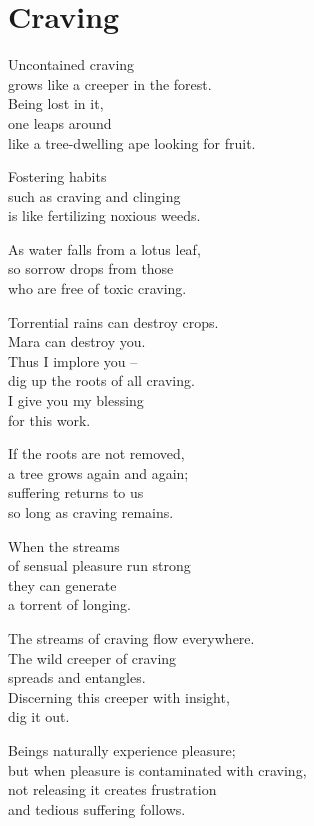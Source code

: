 
\chapter{Craving}


Uncontained craving\\
grows like a creeper in the forest.\\
Being lost in it,\\
one leaps around\\
like a tree-dwelling ape looking for fruit.


Fostering habits\\
such as craving and clinging\\
is like fertilizing noxious weeds.


As water falls from a lotus leaf,\\
so sorrow drops from those\\
who are free of toxic craving.


Torrential rains can destroy crops.\\
Mara can destroy you.\\
Thus I implore you --\\
dig up the roots of all craving.\\
I give you my blessing\\
for this work.


If the roots are not removed,\\
a tree grows again and again;\\
suffering returns to us\\
so long as craving remains.


When the streams\\
of sensual pleasure run strong\\
they can generate\\
a torrent of longing.


The streams of craving flow everywhere.\\
The wild creeper of craving\\
spreads and entangles.\\
Discerning this creeper with insight,\\
dig it out.


Beings naturally experience pleasure;\\
but when pleasure is contaminated with craving,\\
not releasing it creates frustration\\
and tedious suffering follows.


